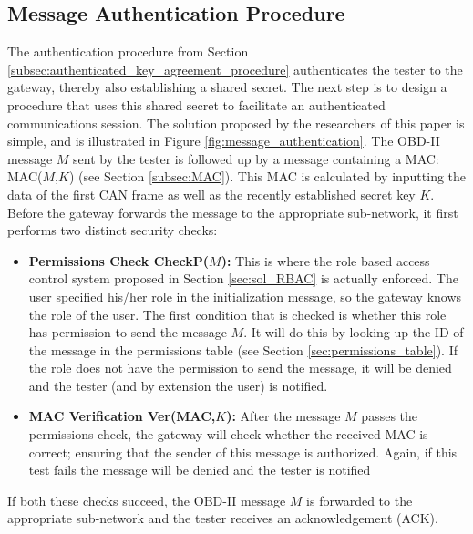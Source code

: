 \subsection{Message Authentication Procedure}
\label{subsec:message_authentication_procedure}

The authentication procedure from Section \ref{subsec:authenticated_key_agreement_procedure} authenticates the tester to the gateway, thereby also establishing a shared secret. The next step is to design a procedure that uses this shared secret to facilitate an authenticated communications session. The solution proposed by the researchers of this paper is simple, and is illustrated in Figure \ref{fig:message_authentication}. The OBD-II message $M$ sent by the tester is followed up by a message containing a MAC: MAC($M$,$K$) (see Section \ref{subsec:MAC}). This MAC is calculated by inputting the data of the first CAN frame as well as the recently established secret key $K$. Before the gateway forwards the message to the appropriate sub-network, it first performs two distinct security checks: 
\begin{itemize}
	\item \textbf{Permissions Check CheckP($M$):} This is where the role based access control system proposed in Section \ref{sec:sol_RBAC} is actually enforced. The user specified his/her role in the initialization message, so the gateway knows the role of the user. The first condition that is checked is whether this role has permission to send the message $M$. It will do this by looking up the ID of the message in the permissions table (see Section \ref{sec:permissions_table}). If the role does not have the permission to send the message, it will be denied and the tester (and by extension the user) is notified.
	
	\item \textbf{MAC Verification Ver(MAC,$K$):} After the message $M$ passes the permissions check, the gateway will check whether the received MAC is correct; ensuring that the sender of this message is authorized. Again, if this test fails the message will be denied and the tester is notified
\end{itemize}
If both these checks succeed, the OBD-II message $M$ is forwarded to the appropriate sub-network and the tester receives an acknowledgement (ACK). 

